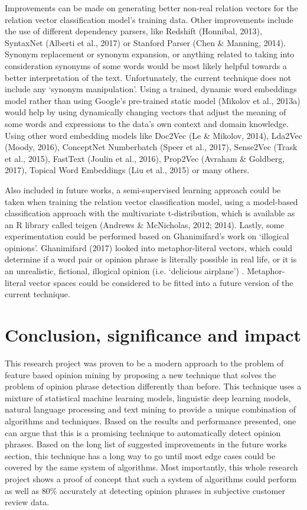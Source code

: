 \documentclass{sig-alternate}
\begin{document}
Improvements can be made on generating better non-real relation vectors for the relation vector classification model's training data. Other improvements include the use of different dependency parsers, like Redshift (Honnibal, 2013), SyntaxNet (Alberti et al., 2017) or Stanford Parser (Chen \& Manning, 2014). Synonym replacement or synonym expansion, or anything related to taking into consideration synonyms of some words would be most likely helpful towards a better interpretation of the text. Unfortunately, the current technique does not include any `synonym manipulation'. Using a trained, dynamic word embeddings model rather than using Google's pre-trained static model (Mikolov et al., 2013a) would help by using dynamically changing vectors that adjust the meaning of some words and expressions to the data's own context and domain knowledge. Using other word embedding models like Doc2Vec (Le \& Mikolov, 2014), Lda2Vec (Moody, 2016), ConceptNet Numberbatch (Speer et al., 2017), Sense2Vec (Trask et al., 2015), FastText (Joulin et al., 2016), Prop2Vec (Avraham \& Goldberg, 2017), Topical Word Embeddings (Liu et al., 2015) or many others.

Also included in future works, a semi-supervised learning approach could be taken when training the relation vector classification model, using a model-based classification approach with the multivariate t-distribution, which is available as an R library called teigen (Andrews \& McNicholas, 2012; 2014). 
Lastly, some experimentation could be performed based on Ghanimifard's work on `illogical opinions'. Ghanimifard (2017) looked into metaphor-literal vectors, which could determine if a word pair or opinion phrase is literally possible in real life, or it is an unrealistic, fictional, illogical opinion (i.e. `delicious airplane') . Metaphor-literal vector spaces could be considered to be fitted into a future version of the current technique.

\section{Conclusion, significance and impact}
This research project was proven to be a modern approach to the problem of feature based opinion mining by proposing a new technique that solves the problem of opinion phrase detection differently than before. This technique uses a mixture of statistical machine learning models, linguistic deep learning models, natural language processing and text mining to provide a unique combination of algorithms and techniques. Based on the results and performance presented, one can argue that this is a promising technique to automatically detect opinion phrases. Based on the long list of suggested improvements in the future works section, this technique has a long way to go until most edge cases could be covered by the same system of algorithms. Most importantly, this whole research project shows a proof of concept that such a system of algorithms could perform as well as 80\% accurately at detecting opinion phrases in subjective customer review data.
\end{document}
